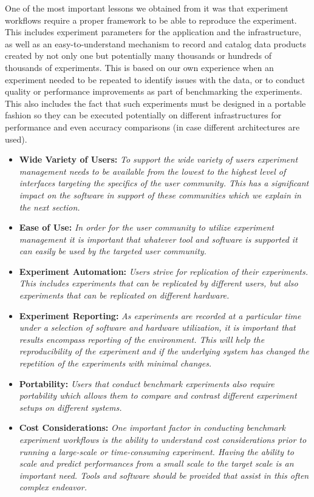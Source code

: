 \documentclass[utf8]{FrontiersinVancouver} %
\begin{document}
One of the most important lessons we obtained from it was that experiment workflows require a proper framework to be able to reproduce the experiment. This includes experiment parameters for the application and the infrastructure, as well as an easy-to-understand mechanism to record and catalog data products created by not only one but potentially many thousands or hundreds of thousands of experiments. This is based on our own experience when an experiment needed to be repeated to identify issues with the data, or to conduct quality or performance improvements as part of benchmarking the experiments. This also includes the fact that such experiments must be designed in a portable fashion so they can be executed potentially on different infrastructures for performance and even accuracy comparisons (in case different architectures are used).


\begin{BOX}

\begin{itemize}

\item {\bf Wide Variety of Users:} {\it To support the wide variety of users experiment management needs to be available from the lowest to the highest level of interfaces targeting the specifics of the user community. This has a significant impact on the software in support of these communities which we explain in the next section.}
\item {\bf Ease of Use:} {\it In order for the user community to utilize experiment management it is important that whatever tool and software is supported it can easily be used by the targeted user community.}
\item {\bf Experiment Automation:} {\it Users strive for replication of their experiments. This includes experiments that can be replicated by different users, but also experiments that can be replicated on different hardware.}
\item {\bf Experiment Reporting:} {\it As experiments are recorded at a particular time under a selection of software and hardware utilization, it is important that results encompass reporting of the environment. This will help the reproducibility of the experiment and if the underlying system has changed the repetition of the experiments with minimal changes.}
\item {\bf Portability:} {\it Users that conduct benchmark experiments also require portability which allows them to compare and contrast different experiment setups on different systems.}
\item {\bf Cost Considerations:} {\it One important factor in conducting benchmark experiment workflows is the ability to understand cost considerations prior to running a large-scale or time-consuming experiment. Having the ability to scale and predict performances from a small scale to the target scale is an important need. Tools and software should be provided that assist in this often complex endeavor.}

\end{itemize}
    
\end{BOX}
\end{document}
